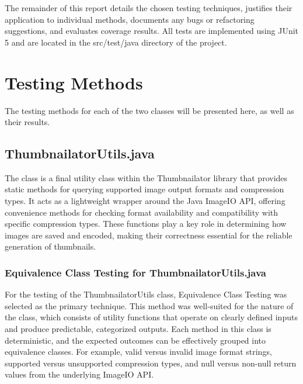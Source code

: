 \documentclass[12pt]{article}
\begin{document}
    The remainder of this report details the chosen testing techniques,
        justifies their application to individual methods, documents any bugs or
        refactoring suggestions, and evaluates coverage results.
    All tests are implemented using JUnit 5 and are located in the src/test/java
        directory of the project.

    \section{Testing Methods}
    \markboth{}{}

    The testing methods for each of the two classes will be presented here, as
        well as their results.

    \subsection{ThumbnailatorUtils.java}
    \markboth{}{}

    The  class is a final utility class within the
        Thumbnailator library that provides static methods for querying
        supported image output formats and compression types.
    It acts as a lightweight wrapper around the Java ImageIO API, offering
        convenience methods for checking format availability and compatibility
        with specific compression types.
    These functions play a key role in determining how images are saved and
        encoded, making their correctness essential for the reliable generation
        of thumbnails.

    \subsubsection{Equivalence Class Testing for ThumbnailatorUtils.java}
    \markboth{}{}

    For the testing of the ThumbnailatorUtils class, Equivalence Class Testing
        was selected as the primary technique.
    This method was well-suited for the nature of the class, which consists of
        utility functions that operate on clearly defined inputs and produce
        predictable, categorized outputs.
    Each method in this class is deterministic, and the expected outcomes can be
        effectively grouped into equivalence classes. For example, valid
        versus invalid image format strings, supported versus unsupported
        compression types, and null versus non-null return values from the
        underlying ImageIO API.
\end{document}
